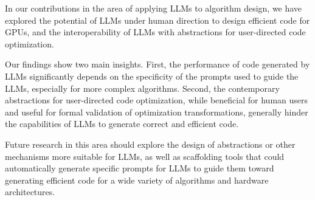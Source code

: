 In our contributions in the area of applying LLMs to algorithm design, we have explored the potential of LLMs under human direction to design efficient code for GPUs, and the interoperability of LLMs with abstractions for user-directed code optimization.

Our findings show two main insights. First, the performance of code generated by LLMs significantly depends on the specificity of the prompts used to guide the LLMs, especially for more complex algorithms. Second, the contemporary abstractions for user-directed code optimization, while beneficial for human users and useful for formal validation of optimization transformations, generally hinder the capabilities of LLMs to generate correct and efficient code.

Future research in this area should explore the design of abstractions or other mechanisms more suitable for LLMs, as well as scaffolding tools that could automatically generate specific prompts for LLMs to guide them toward generating efficient code for a wide variety of algorithms and hardware architectures.
